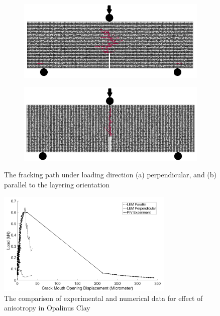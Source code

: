 \begin{figure}[!ht]
\centering
\begin{subfigure}[b]{0.55\textwidth}
\includegraphics[width=1\linewidth]{figures/Amir_ME1_LEM_Perpendicular.png}
\subcaption{}
\label{fig:Amir_ME1_LEM_Perpendicular}
\end{subfigure}
\begin{subfigure}[b]{0.55\textwidth}
\includegraphics[width=1\linewidth]{figures/Amir_ME1_LEM_Parallel.png}
\subcaption{}
\label{fig:Amir_ME1_LEM_Parallel}
\end{subfigure}
\caption{The fracking path under loading direction (a) perpendicular, and (b) parallel to the layering orientation}
\end{figure}

\begin{figure}[!ht]
\centering
\includegraphics[width=0.75\textwidth]{figures/Amir_ME1_LEM_Claystone.png}
\caption{The comparison of experimental and numerical data for effect of anisotropy in Opalinus Clay} 
\label{fig:Amir_ME1_LEM_Claystone}
\end{figure}

